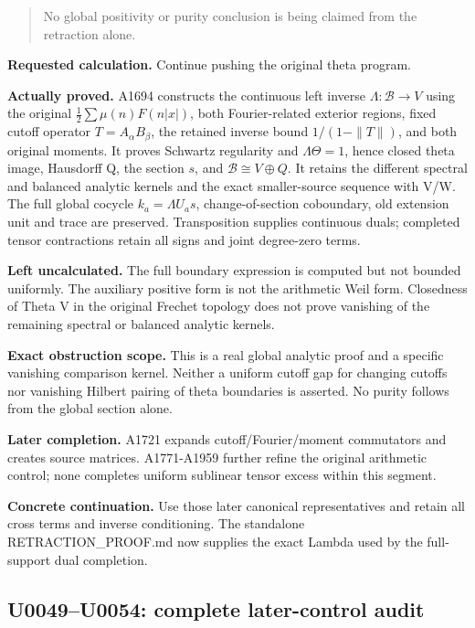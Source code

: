 \begin{quote}
No global positivity or purity conclusion is being claimed from the
retraction alone.
\end{quote}

\textbf{Requested calculation.} Continue pushing the original theta
program.

\textbf{Actually proved.} A1694 constructs the continuous left inverse
\(\Lambda:\mathscr B\to V\) using the original
\(\frac12\sum\mu(n)F(n|x|)\), both Fourier-related exterior regions,
fixed cutoff operator \(T=A_\alpha B_\beta\), the retained inverse bound
\(1/(1-\|T\|)\), and both original moments. It proves Schwartz
regularity and \(\Lambda\Theta=1\), hence closed theta image, Hausdorff
Q, the section \(s\), and \(\mathscr B\cong V\oplus Q\). It retains the
different spectral and balanced analytic kernels and the exact
smaller-source sequence with V/W. The full global cocycle
\(k_a=\Lambda U_as\), change-of-section coboundary, old extension unit
and trace are preserved. Transposition supplies continuous duals;
completed tensor contractions retain all signs and joint degree-zero
terms.

\textbf{Left uncalculated.} The full boundary expression  is computed but not bounded uniformly. The auxiliary positive form is
not the arithmetic Weil form. Closedness of Theta V in the original
Frechet topology does not prove vanishing of the remaining spectral or
balanced analytic kernels.

\textbf{Exact obstruction scope.} This is a real global analytic proof
and a specific vanishing comparison kernel. Neither a uniform cutoff gap
for changing cutoffs nor vanishing Hilbert pairing of theta boundaries
is asserted. No purity follows from the global section alone.

\textbf{Later completion.} A1721 expands cutoff/Fourier/moment
commutators and creates source matrices. A1771-A1959 further refine the
original arithmetic control; none completes uniform sublinear tensor
excess within this segment.

\textbf{Concrete continuation.} Use those later canonical
representatives and retain all cross terms and inverse conditioning. The
standalone RETRACTION\_PROOF.md now supplies the exact Lambda used by
the full-support dual completion.

\subsection{U0049--U0054: complete later-control
audit}\label{u0049u0054-complete-later-control-audit}

